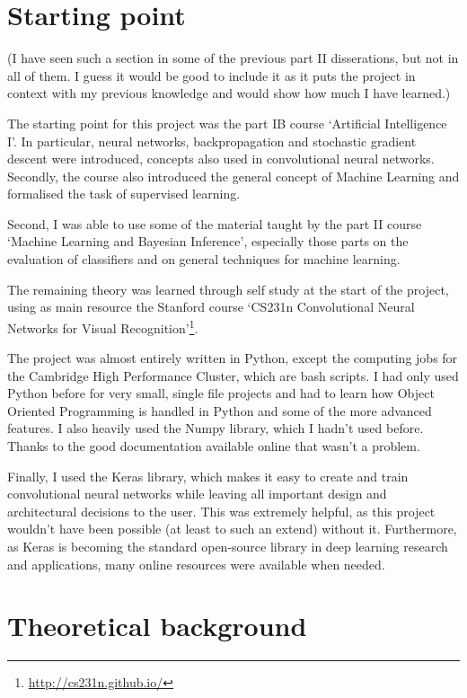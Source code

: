 \documentclass[12pt,a4paper,twoside,openright]{report}
\begin{document}
\section{Starting point}
(I have seen such a section in some of the previous part II disserations, but not in all of them. I guess it would be good to include it as it puts the project in context with my previous knowledge and would show how much I have learned.)

The starting point for this project was the part IB course `Artificial Intelligence I'. In particular, neural networks, backpropagation and stochastic gradient descent were introduced, concepts also used in convolutional neural networks. Secondly, the course also introduced the general concept of Machine Learning and formalised the task of supervised learning.

Second, I was able to use some of the material taught by the part II course `Machine Learning and Bayesian Inference', especially those parts on the evaluation of classifiers and on general techniques for machine learning.

The remaining theory was learned through self study at the start of the project, using as main resource the Stanford course `CS231n Convolutional Neural Networks for Visual Recognition'\footnote{\url{http://cs231n.github.io/}}.

The project was almost entirely written in Python, except the computing jobs for the Cambridge High Performance Cluster, which are bash scripts. I had only used Python before for very small, single file projects and had to learn how Object Oriented Programming is handled in Python and some of the more advanced features. I also heavily used the Numpy library, which I hadn't used before. Thanks to the good documentation available online that wasn't a problem.

Finally, I used the Keras library, which makes it easy to create and train convolutional neural networks while leaving all important design and architectural decisions to the user. This was extremely helpful, as this project wouldn't have been possible (at least to such an extend) without it. Furthermore, as Keras is becoming the standard open-source library in deep learning research and applications, many online resources were available when needed.

\section{Theoretical background}
\end{document}
